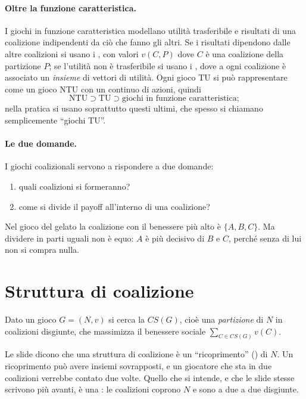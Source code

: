 \paragraph{Oltre la funzione caratteristica.}
I giochi in funzione caratteristica modellano utilità trasferibile e risultati di una
coalizione indipendenti da ciò che fanno gli altri. Se i risultati dipendono dalle altre
coalizioni si usano i , con valori $v(C, P)$ dove $C$
è una coalizione della partizione $P$; se l'utilità non è trasferibile si usano i
, dove a ogni coalizione è associato un \emph{insieme} di vettori di utilità.
Ogni gioco TU si può rappresentare come un gioco NTU con un continuo di azioni, quindi
\[
  \text{NTU} \supset \text{TU} \supset \text{giochi in funzione caratteristica};
\]
nella pratica si usano soprattutto questi ultimi, che spesso si chiamano semplicemente
``giochi TU''.

\paragraph{Le due domande.}
I giochi coalizionali servono a rispondere a due domande:
\begin{enumerate}
  \item quali coalizioni si formeranno?
  \item come si divide il payoff all'interno di una coalizione?
\end{enumerate}
Nel gioco del gelato la coalizione con il benessere più alto è $\{A,B,C\}$. Ma dividere in
parti uguali non è equo: $A$ è più decisivo di $B$ e $C$, perché senza di lui non si compra
nulla.

\section{Struttura di coalizione}

\begin{definizione}
Dato un gioco $G = (N,v)$ si cerca la  $CS(G)$, cioè una
\emph{partizione} di $N$ in coalizioni disgiunte, che massimizza il benessere sociale
$\sum_{C \in CS(G)} v(C)$.
\end{definizione}

\begin{attenzione}
Le slide dicono che una struttura di coalizione è un ``ricoprimento'' () di $N$.
Un ricoprimento può avere insiemi sovrapposti, e un giocatore che sta in due coalizioni
verrebbe contato due volte. Quello che si intende, e che le slide stesse scrivono più
avanti, è una : le coalizioni coprono $N$ e sono a due a due disgiunte.
\end{attenzione}

